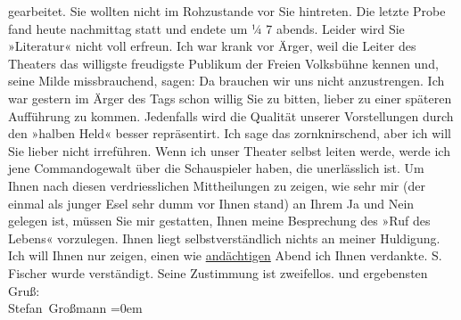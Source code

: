 \begin{ledgroupsized}[t]{13cm}
               gearbeitet. Sie wollten nicht im Rohzustande vor Sie hintreten.\pend
           \pstart
           Die letzte Probe fand heute nachmittag statt und endete um ¼ 7
               abends.\pend
           \pstart
           Leider wird Sie »Literatur« nicht voll erfreun.
               Ich war krank vor Ärger, weil die Leiter des Theaters das willigste  freudigste Publikum der Freien Volksbühne kennen und, seine Milde missbrauchend, sagen: Da
               brauchen wir uns nicht anzustrengen.\pend
           \pstart
           {\pb}Ich war gestern im Ärger des Tags schon
               willig Sie zu bitten, lieber zu einer späteren Aufführung zu kommen. Jedenfalls wird
               die Qualität unserer Vorstellungen durch den »halben
                  Held« besser repräsentirt.\pend
           \pstart
           Ich sage das zornknirschend, aber ich will Sie lieber nicht irreführen. Wenn ich
               unser Theater selbst leiten werde, werde ich jene {\pb}Commandogewalt über die Schauspieler haben,
               die unerlässlich ist.\pend
           \pstart
           Um Ihnen nach diesen verdriesslichen Mittheilungen zu zeigen, wie sehr mir (der
               einmal als junger Esel sehr dumm vor Ihnen stand) an Ihrem Ja und Nein gelegen ist,
               müssen Sie mir gestatten, Ihnen meine Besprechung des »Ruf des
                  Lebens« vorzulegen. Ihnen liegt selbstverständlich nichts an {\pb}meiner Huldigung. Ich will Ihnen nur zeigen,
               einen wie \uline{andächtigen} Abend ich Ihnen verdankte.\pend
           \pstart
           S. Fischer wurde verständigt. Seine Zustimmung
               ist zweifellos.\pend
           \pstart
            und ergebensten Gruß:{\\[\baselineskip]}\spacefill\mbox{Stefan Großmann}\pend
           \leftskip=0em{}
         
         \endnumbering{}\end{ledgroupsized}  \newcommand{\dateiname}{L01921}\newcommand{\titel}{Stefan Großmann an Arthur Schnitzler, 2. 4. 1910}\newcommand{\editorInnen}{ Martin Anton Müller und Gerd-Hermann Susen}
      